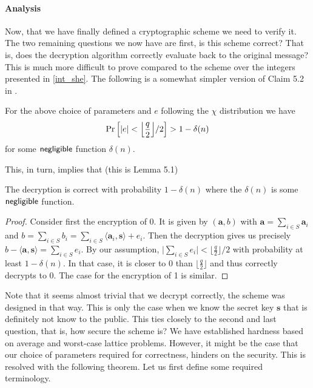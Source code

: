 \paragraph{Analysis}
Now, that we have finally defined a cryptographic scheme we need to verify it. The two remaining questions we now have are first, is this scheme correct? That is, does the decryption algorithm correctly evaluate back to the original message? This is much more difficult to prove compared to the scheme over the integers presented in \ref{int_she}. The following is a somewhat simpler version of Claim 5.2 in \cite{regev}.
\begin{claim}[Correctness]
    For the above choice of parameters and $e$ following the $\chi$ distribution we have
    \begin{equation} \Pr \Big[ |e| < \Bigl \lfloor \frac{q}{2} \Bigr \rfloor /2 \Big] > 1 - \delta(n) \end{equation}
    for some $\alg{negligible}$ function $\delta(n)$.
\end{claim}
This, in turn, implies that (this is Lemma 5.1)
\begin{lemma}
    The decryption is correct with probability $1 - \delta(n)$ where the $\delta(n)$ is some $\alg{negligible}$ function.
\end{lemma}

\begin{proof}
    Consider first the encryption of 0. It is given by $(\bm{a}, b)$ with $\bm{a} = \sum_{i \in S}\bm{a}_i$ and $b = \sum_{i \in S} b_i = \sum_{i \in S} \langle \bm{a}_i, \bm{s} \rangle + e_i$. Then the decryption gives us precisely $b - \langle \bm{a}, \bm{s} \rangle = \sum_{i \in S} e_i$. By our assumption, $\big| \sum_{i \in S} e_i \big| < \bigl \lfloor \frac{q}{2} \bigr \rfloor /2$ with probability at least $1 - \delta(n)$. In that case, it is closer to 0 than $\bigl \lfloor \frac{q}{2} \bigr \rfloor$ and thus correctly decrypts to 0. The case for the encryption of 1 is similar.
\end{proof}

Note that it seems almost trivial that we decrypt correctly, the scheme was designed in that way. This is only the case when we know the secret key $\bm{s}$ that is definitely not know to the public. This ties closely to the second and last question, that is, how secure the scheme is? We have established hardness based on average and worst-case lattice problems. However, it might be the case that our choice of parameters required for correctness, hinders on the security. This is resolved with the following theorem. Let us first define some required terminology.

